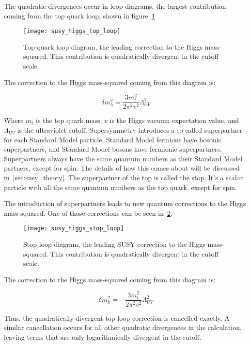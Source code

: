 The quadratic divergences occur in loop diagrams,
the largest contribution coming from the top quark loop, shown in figure~\ref{fig:susy_top_loop}

\begin{figure}[h!]
    \centering
\texttt{[image: susy\_higgs\_top\_loop]}
\caption{Top-quark loop diagram, the leading correction to the Higgs mass-squared. This contribution is quadratically divergent in the cutoff scale.}
\label{fig:susy_top_loop}
\end{figure}

The correction to the Higgs mass-squared coming from this diagram is:

\begin{equation}\label{eq:higgs_top_correction}
    \delta m_h^2 = \frac{3m_t^2}{2\pi^2 v^2}\Lambda_{UV}^2
\end{equation}

Where $m_t$ is the top quark mass, $v$ is the Higgs vacuum expectation value, and $\Lambda_{UV}$ is the ultraviolet cutoff.
Supersymmetry introduces a so-called superpartner for each Standard Model particle.
Standard Model fermions have bosonic superpartners, and Standard Model bosons have fermionic superpartners.
Superpartners always have the same quantum numbers as their Standard Model partners, except for spin.
The details of how this comes about will be discussed in~\ref{sec:susy_theory}.
The superpartner of the top is called the stop.
It's a scalar particle with all the same quantum numbers as the top quark, except for spin.

The introduction of superpartners leads to new quantum corrections to the Higgs mass-squared.
One of those corrections can be seen in~\ref{fig:susy_stop_loop}.

\begin{figure}[h!]
    \centering
\texttt{[image: susy\_higgs\_stop\_loop]}
\caption{Stop loop diagram, the leading SUSY correction to the Higgs mass-squared. This contribution is quadratically divergent in the cutoff scale.}
\label{fig:susy_stop_loop}
\end{figure}

The correction to the Higgs mass-squared coming from this diagram is:

\begin{equation}\label{eq:higgs_stop_correction}
    \delta m_h^2 = -\frac{3m_t^2}{2\pi^2 v^2}\Lambda_{UV}^2
\end{equation}

Thus, the quadratically-divergent top-loop correction is cancelled exactly.
A similar cancellation occurs for all other quadratic divergences in the calculation,
leaving terms that are only logarithmically divergent in the cutoff.

